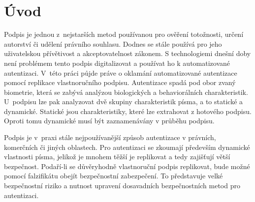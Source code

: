 
%

\chapter{Úvod}
Podpis je jednou z~nejstarších metod používanou pro ověření totožnosti, určení autorství či udělení právního souhlasu.
Dodnes se stále používá pro jeho uživatelskou přívětivost a akceptovatelnost zákonem.
S technologiemi dnešní doby není problémem tento podpis digitalizovat a používat ho k automatizované autentizaci.
V~této práci půjde práve o oklamání automatizované autentizace pomocí replikace vlastnoručního podpisu.
Autentizace spadá pod obor zvaný biometrie, která se zabývá analýzou biologických a behaviorálních charakteristik. 
U~podpisu lze pak analyzovat dvě skupiny charakteristik písma, a to statické a dynamické. 
Statické jsou charakteristiky, které lze extrahovat z hotového podpisu.
Oproti tomu dynamické musí být zaznamenávány v průběhu podpisu.

Podpis je v~praxi stále nejpoužívanější způsob autentizace v právních, komerčních či jiných oblastech. 
Pro autentizaci se zkoumají především dynamické vlastnosti písma, jelikož je mnohem těžší je replikovat a tedy zajišťují větší bezpečnost.
Podaří-li se důvěryhodně vlastnoruční podpis replikovat, bude možné pomocí falzifikátu obejít bezpečnostní zabezpečení. 
To představuje velké bezpečnostní riziko a nutnost upravení dosavadních bezpečnostních metod pro autentizaci. 




